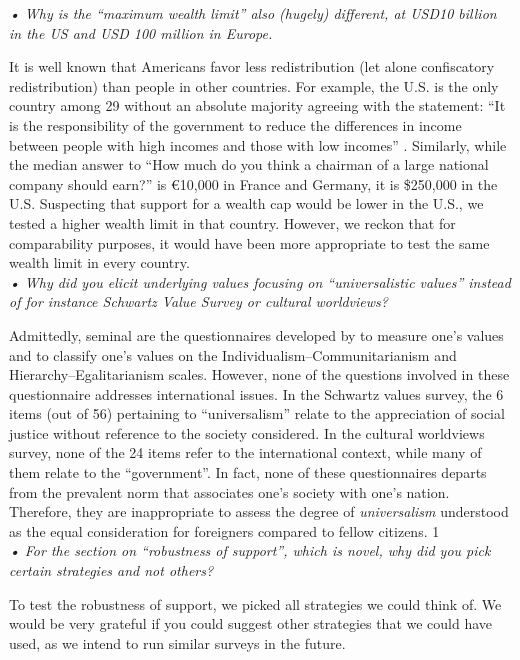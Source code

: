 \documentclass[12pt,english]{article}
\begin{document}
\textit{• Why is the “maximum wealth limit” also (hugely) different, at USD10 billion in the US and USD 100 million in Europe.} 

It is well known that Americans favor less redistribution (let alone confiscatory redistribution) than people in other countries. For example, the U.S. is the only country among 29 without an absolute majority agreeing with the statement: ``It is the responsibility of the government to reduce the differences in income between people with high incomes and those with low incomes'' \citep{issp_international_2019}. Similarly, while the median answer to ``How much do you think a chairman of a large national company should earn?'' is \euro{}10,000 in France and Germany, it is \$250,000 in the U.S. Suspecting that support for a wealth cap would be lower in the U.S., we tested a higher wealth limit in that country. However, we reckon that for comparability purposes, it would have been more appropriate to test the same wealth limit in every country.
~\\

\textit{• Why did you elicit underlying values focusing on “universalistic values” instead of for instance Schwartz Value Survey or cultural worldviews?}%

Admittedly, seminal are the questionnaires developed by \citet{schwartz_are_1994} to measure one's values and \citet{douglas_risk_1982} to classify one's values on the Individualism--Communitarianism and Hierarchy--Egalitarianism scales. However, none of the questions involved in these questionnaire addresses international issues. In the Schwartz values survey, the 6 items (out of 56) pertaining to ``universalism'' relate to the appreciation of social justice without reference to the society considered. In the cultural worldviews survey, none of the 24 items refer to the international context, while many of them relate to the ``government''. In fact, none of these questionnaires departs from the prevalent norm that associates one's society with one's nation. Therefore, they are inappropriate to assess the degree of \textit{universalism} understood as the equal consideration for foreigners compared to fellow citizens. 1
~\\

\textit{• For the section on “robustness of support”, which is novel, why did you pick certain strategies and not others?}

To test the robustness of support, we picked all strategies we could think of. We would be very grateful if you could suggest other strategies that we could have used, as we intend to run similar surveys in the future.
~\\
\end{document}
